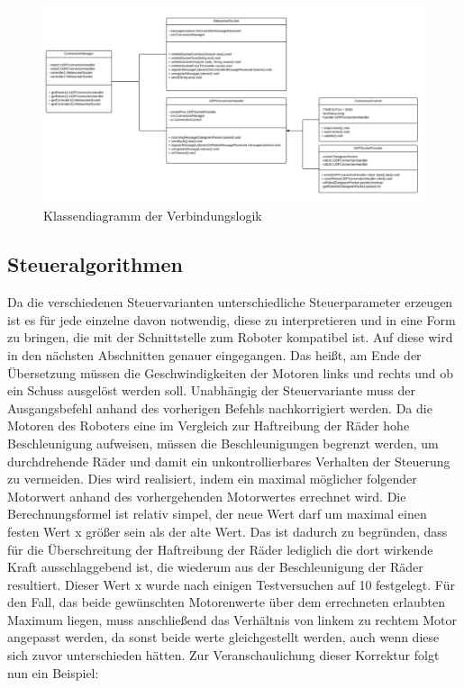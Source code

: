 \begin{figure}[!h]
	\includegraphics[width=\textwidth]{images/uml_verbindung.pdf}
	\caption{Klassendiagramm der Verbindungslogik}
	\label{fig:uml_verbindung}
\end{figure}



\subsection{Steueralgorithmen}
Da die verschiedenen Steuervarianten unterschiedliche Steuerparameter erzeugen ist es für jede einzelne davon notwendig, diese zu interpretieren und in eine Form zu bringen, die mit der Schnittstelle zum Roboter kompatibel ist. Auf diese wird in den nächsten Abschnitten genauer eingegangen. Das heißt, am Ende der Übersetzung müssen die Geschwindigkeiten der Motoren links und rechts und ob ein Schuss ausgelöst werden soll. Unabhängig der Steuervariante muss der Ausgangsbefehl anhand des vorherigen Befehls nachkorrigiert werden. Da die Motoren des Roboters eine im Vergleich zur Haftreibung der Räder hohe Beschleunigung aufweisen, müssen die Beschleunigungen begrenzt werden, um durchdrehende Räder und damit ein unkontrollierbares Verhalten der Steuerung zu vermeiden. 
Dies wird realisiert, indem ein maximal möglicher folgender Motorwert anhand des vorhergehenden Motorwertes errechnet wird. Die Berechnungsformel ist relativ simpel, der neue Wert darf um maximal einen festen Wert x größer sein als der alte Wert. Das ist dadurch zu begründen, dass für die Überschreitung der Haftreibung der Räder lediglich die dort wirkende Kraft ausschlaggebend ist, die wiederum aus der Beschleunigung der Räder resultiert. Dieser Wert x wurde nach einigen Testversuchen auf 10 festgelegt. Für den Fall, das beide gewünschten Motorenwerte über dem errechneten erlaubten Maximum liegen, muss anschließend das Verhältnis von linkem zu rechtem Motor angepasst werden, da sonst beide werte gleichgestellt werden, auch wenn diese sich zuvor unterschieden hätten. 
Zur Veranschaulichung dieser Korrektur folgt nun ein Beispiel:

